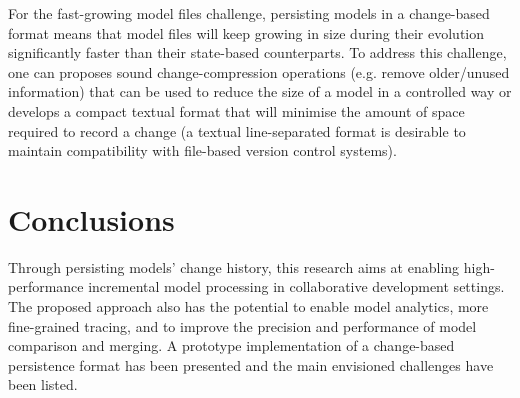 For the fast-growing model files challenge, persisting models in a change-based format means that model files will keep growing in size during their evolution significantly faster than their state-based counterparts. To address this challenge, one can proposes sound change-compression operations (e.g. remove older/unused information) that can be used to reduce the size of a model in a controlled way or develops a compact textual format that will minimise the amount of space required to record a change (a textual line-separated format is desirable to maintain compatibility with file-based version control systems).  

\section{Conclusions}
\label{sec:conclusions_2}
Through persisting models' change history, this research aims at enabling high-performance incremental model processing in collaborative development settings. The proposed approach also has the potential to enable model analytics, more fine-grained tracing, and to improve the precision and performance of model comparison and merging. A prototype implementation of a change-based persistence format has been presented and the main envisioned challenges have been listed. 